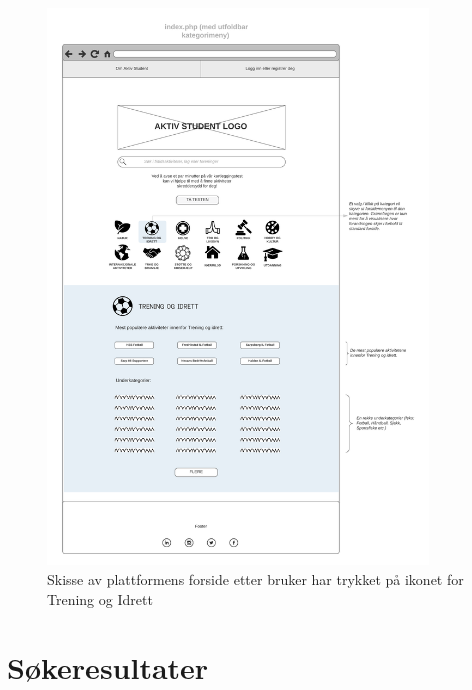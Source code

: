 \begin{figure}[H]
\centering
\includegraphics[width=0.9\textwidth]{Illustrasjoner/Skisser/2.0/2-2-forside-utbrettsmeny.png}
\caption{Skisse av plattformens forside etter bruker har trykket på ikonet for Trening og Idrett}
\label{vedlegg:2-2-forside-utbrett}
\end{figure}

\section{Søkeresultater}

